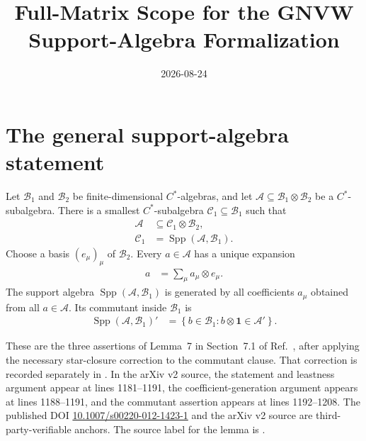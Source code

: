 \documentclass[11pt]{article}
\title{Full-Matrix Scope for the GNVW Support-Algebra Formalization}
\author{}
\date{2026-08-24}
\begin{document}
\maketitle
{}

\section{The general support-algebra statement}

Let $\mathcal B_1$ and $\mathcal B_2$ be finite-dimensional $C^*$-algebras,
and let $\mathcal A\subseteq\mathcal B_1\otimes\mathcal B_2$ be a
$C^*$-subalgebra. There is a smallest $C^*$-subalgebra
$\mathcal C_1\subseteq\mathcal B_1$ such that
\begin{align}
    \mathcal A
    &\subseteq\mathcal C_1\otimes\mathcal B_2,
    \label{eq:gnvw12_support_algebra_full_matrix_scope_support_containment}\\
    \mathcal C_1
    &=\operatorname{Spp}(\mathcal A,\mathcal B_1).
    \label{eq:gnvw12_support_algebra_full_matrix_scope_support_definition}
\end{align}
Choose a basis $(e_\mu)_\mu$ of $\mathcal B_2$. Every $a\in\mathcal A$ has a
unique expansion
\begin{align}
    a
    &=\sum_\mu a_\mu\otimes e_\mu.
    \label{eq:gnvw12_support_algebra_full_matrix_scope_coefficient_expansion}
\end{align}
The support algebra
$\operatorname{Spp}(\mathcal A,\mathcal B_1)$ is generated by all
coefficients $a_\mu$ obtained from all $a\in\mathcal A$. Its commutant inside
$\mathcal B_1$ is
\begin{align}
    \operatorname{Spp}(\mathcal A,\mathcal B_1)'
    &=\left\{b\in\mathcal B_1:
      b\otimes\mathbf{1}\in\mathcal A'\right\}.
    \label{eq:gnvw12_support_algebra_full_matrix_scope_commutant}
\end{align}

These are the three assertions of Lemma~7 in Section~7.1 of
Ref.~\cite{Gross2012IndexTheory}, after applying the necessary star-closure
correction to the commutant clause. That correction is recorded separately in
. In the arXiv
v2 source, the statement and leastness argument appear at lines 1181--1191,
the coefficient-generation argument appears at lines 1188--1191, and the
commutant assertion appears at lines 1192--1208. The published DOI
\href{https://doi.org/10.1007/s00220-012-1423-1}
{10.1007/s00220-012-1423-1} and the arXiv v2 source are
third-party-verifiable anchors. The source label for the lemma is
.
\end{document}
